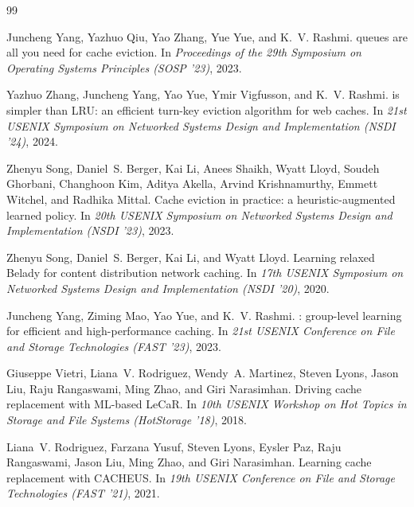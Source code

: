 \documentclass[letterpaper,twocolumn,10pt]{article}
\begin{document}
 
\begin{thebibliography}{99}
 
Juncheng Yang, Yazhuo Qiu, Yao Zhang, Yue Yue, and K.~V. Rashmi.
 queues are all you need for cache eviction.
\newblock In {\em Proceedings of the 29th Symposium on Operating Systems
  Principles (SOSP '23)}, 2023.
 
Yazhuo Zhang, Juncheng Yang, Yao Yue, Ymir Vigfusson, and K.~V. Rashmi.
 is simpler than {LRU}: an efficient turn-key eviction
  algorithm for web caches.
\newblock In {\em 21st USENIX Symposium on Networked Systems Design and
  Implementation (NSDI '24)}, 2024.
 
Zhenyu Song, Daniel~S. Berger, Kai Li, Anees Shaikh, Wyatt Lloyd, Soudeh
  Ghorbani, Changhoon Kim, Aditya Akella, Arvind Krishnamurthy, Emmett
  Witchel, and Radhika Mittal.
\newblock Cache eviction in practice: a heuristic-augmented learned policy.
\newblock In {\em 20th USENIX Symposium on Networked Systems Design and
  Implementation (NSDI '23)}, 2023.
 
Zhenyu Song, Daniel~S. Berger, Kai Li, and Wyatt Lloyd.
\newblock Learning relaxed {Belady} for content distribution network caching.
\newblock In {\em 17th USENIX Symposium on Networked Systems Design and
  Implementation (NSDI '20)}, 2020.
 
Juncheng Yang, Ziming Mao, Yao Yue, and K.~V. Rashmi.
: group-level learning for efficient and high-performance
  caching.
\newblock In {\em 21st USENIX Conference on File and Storage Technologies
  (FAST '23)}, 2023.
 
Giuseppe Vietri, Liana~V. Rodriguez, Wendy~A. Martinez, Steven Lyons, Jason
  Liu, Raju Rangaswami, Ming Zhao, and Giri Narasimhan.
\newblock Driving cache replacement with {ML}-based {LeCaR}.
\newblock In {\em 10th USENIX Workshop on Hot Topics in Storage and File
  Systems (HotStorage '18)}, 2018.
 
Liana~V. Rodriguez, Farzana Yusuf, Steven Lyons, Eysler Paz, Raju Rangaswami,
  Jason Liu, Ming Zhao, and Giri Narasimhan.
\newblock Learning cache replacement with {CACHEUS}.
\newblock In {\em 19th USENIX Conference on File and Storage Technologies
  (FAST '21)}, 2021.
 

\end{thebibliography}
\end{document}
